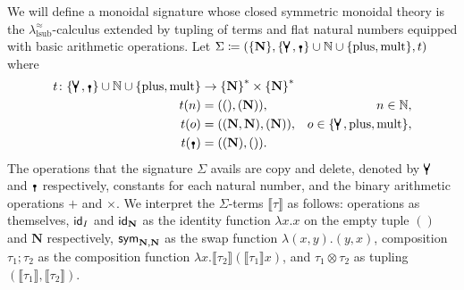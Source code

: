We will define a monoidal signature whose closed symmetric monoidal theory is the $\lambda^\approx_{\text{lsub}}$-calculus extended by tupling of terms and flat natural numbers equipped with basic arithmetic operations.
Let $\Sigma \coloneq (\{ \mathbf{N} \}, \{ \comonoid, \counit \} \cup \mathbb{N} \cup \{ \text{plus}, \text{mult} \}, t)$ where
\begin{align*}
	t\colon \{ \comonoid, \counit \} \cup \mathbb{N} \cup \{ \text{plus}, \text{mult} \} & \to {\{ \mathbf{N} \}}^* \times {\{ \mathbf{N} \}}^*                                                    \\
	t(n)                                                                                 & = ((), (\mathbf{N})),                                & n \in \mathbb{N},                                \\
	t(o)                                                                                 & = ((\mathbf{N}, \mathbf{N}), (\mathbf{N})),          & o \in \{ \comonoid, \text{plus}, \text{mult} \}, \\
	t(\counit)                                                                           & = ((\mathbf{N}), ()).
\end{align*}
The operations that the signature $\Sigma$ avails are copy and delete, denoted by $\comonoid$ and $\counit$ respectively, constants for each natural number, and the binary arithmetic operations $+$ and $\times$.
We interpret the $\Sigma$-terms $\llbracket \tau \rrbracket$ as follows: operations as themselves, $\textsf{id}_{I}$ and $\textsf{id}_{\mathbf{N}}$ as the identity function $\lambda x. x$ on the empty tuple $()$ and $\mathbf{N}$ respectively, $\textsf{sym}_{\mathbf{N}, \mathbf{N}}$ as the swap function $\lambda (x, y). (y, x)$, composition $\tau_1 ; \tau_2$ as the composition function $\lambda x. \llbracket \tau_2 \rrbracket \left(\llbracket \tau_1 \rrbracket x\right)$, and $\tau_1 \otimes \tau_2$ as tupling $\left(\llbracket \tau_1 \rrbracket, \llbracket \tau_2 \rrbracket\right)$.

